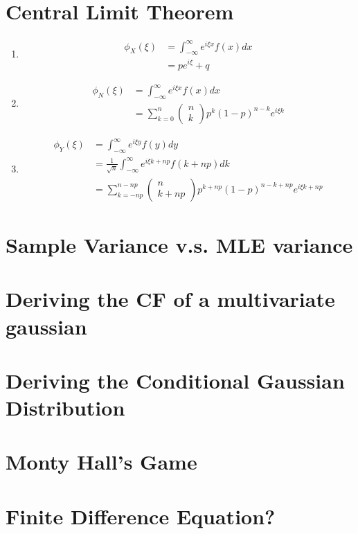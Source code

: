 \documentclass{article}
\begin{document}
\section{Central Limit Theorem}
    \begin{enumerate}[label=\roman*)]
        \item 
            \begin{align*}
                \phi_X(\xi) &= \int_{-\infty}^{\infty} e^{i\xi x}f(x)dx 
                \\
                &= pe^{i\xi} + q
            \end{align*}
        \item 
            \begin{align*}
                \phi_N(\xi) &= \int_{-\infty}^{\infty} e^{i\xi x}f(x)dx 
                \\
                &= \sum_{k=0}^n \left(\begin{array}{c} n\\k\end{array}\right)
                p^k(1-p)^{n-k}e^{i\xi k}
            \end{align*}
        \item 
            \begin{align*}
                \phi_Y(\xi) &= \int_{-\infty}^{\infty} e^{i\xi y}f(y)dy
                \\
                &= \frac{1}{\sqrt{n}}\int_{-\infty}^{\infty} e^{i\xi k+np}f(k + np)dk
                \\
                &= \sum_{k=-np}^{n-np} \left(\begin{array}{c} n\\k +
                np\end{array}\right)
                p^{k+np}(1-p)^{n-k+np}e^{i\xi k+np}
            \end{align*}
    \end{enumerate}

\section{Sample Variance v.s. MLE variance}

\section{Deriving the CF of a multivariate gaussian}

\section{Deriving the Conditional Gaussian Distribution}

\section{Monty Hall's Game}

\section{Finite Difference Equation?}
\end{document}
